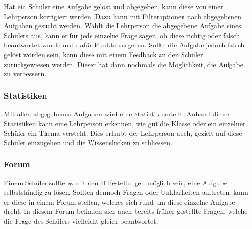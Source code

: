 Hat ein Schüler eine Aufgabe gelöst und abgegeben, kann diese von einer Lehrperson korrigiert werden. Dazu kann mit Filteroptionen nach abgegebenen Aufgaben gesucht werden. Wählt die Lehrperson die abgegebene Aufgabe eines Schülers aus, kann er für jede einzelne Frage sagen, ob diese richtig oder falsch beantwortet wurde und dafür Punkte vergeben. Sollte die Aufgabe jedoch falsch gelöst worden sein, kann diese mit einem Feedback an den Schüler zurückgewiesen werden. Dieser hat dann nochmals die Möglichkeit, die Aufgabe zu verbessern. 

\subsubsection*{Statistiken}
Mit allen abgegebenen Aufgaben wird eine Statistik erstellt. Anhand dieser Statistiken kann eine Lehrperson erkennen, wie gut die Klasse oder ein einzelner Schüler ein Thema versteht. Dies erlaubt der Lehrperson auch, gezielt auf diese Schüler einzugehen und die Wissenslücken zu schliessen.

\subsubsection*{Forum}
Einem Schüler sollte es mit den Hilfestellungen möglich sein, eine Aufgabe selbstständig zu lösen. Sollten dennoch Fragen oder Unklarheiten auftreten, kann er diese in einem Forum stellen, welches sich rund um diese einzelne Aufgabe dreht. In diesem Forum befinden sich auch bereits früher gestellte Fragen, welche die Frage des Schülers vielleicht gleich beantwortet.


\newpage